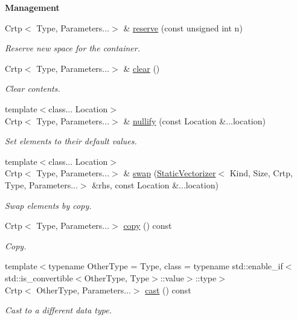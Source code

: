 \begin{Indent}{\bf Management}\par
\begin{DoxyCompactItemize}
\item 
Crtp$<$ Type, Parameters...$>$ \& \hyperlink{classmagrathea_1_1StaticVectorizer_ae15629a58700e638e2a4546742cf09f6}{reserve} (const unsigned int n)
\begin{DoxyCompactList}\small\item\em Reserve new space for the container. \end{DoxyCompactList}\item 
Crtp$<$ Type, Parameters...$>$ \& \hyperlink{classmagrathea_1_1StaticVectorizer_abc4fdc2ce798bc99edc1a874a90bbfe5}{clear} ()
\begin{DoxyCompactList}\small\item\em Clear contents. \end{DoxyCompactList}\item 
{\footnotesize template$<$class... Location$>$ }\\Crtp$<$ Type, Parameters...$>$ \& \hyperlink{classmagrathea_1_1StaticVectorizer_aa2d036d08b09e0f8ec903c7c6442db2b}{nullify} (const Location \&...location)
\begin{DoxyCompactList}\small\item\em Set elements to their default values. \end{DoxyCompactList}\item 
{\footnotesize template$<$class... Location$>$ }\\Crtp$<$ Type, Parameters...$>$ \& \hyperlink{classmagrathea_1_1StaticVectorizer_a8bf8d5dc7fd3290eff136f1262342e8b}{swap} (\hyperlink{classmagrathea_1_1StaticVectorizer}{Static\-Vectorizer}$<$ Kind, Size, Crtp, Type, Parameters...$>$ \&rhs, const Location \&...location)
\begin{DoxyCompactList}\small\item\em Swap elements by copy. \end{DoxyCompactList}\item 
Crtp$<$ Type, Parameters...$>$ \hyperlink{classmagrathea_1_1StaticVectorizer_a15c61ea6878c48725951cce33147cd22}{copy} () const 
\begin{DoxyCompactList}\small\item\em Copy. \end{DoxyCompactList}\item 
{\footnotesize template$<$typename Other\-Type  = Type, class  = typename std\-::enable\-\_\-if$<$std\-::is\-\_\-convertible$<$\-Other\-Type, Type$>$\-::value$>$\-::type$>$ }\\Crtp$<$ Other\-Type, Parameters...$>$ \hyperlink{classmagrathea_1_1StaticVectorizer_ad3d731d6d65b0c6779f8bfa098743817}{cast} () const 
\begin{DoxyCompactList}\small\item\em Cast to a different data type. \end{DoxyCompactList}\end{DoxyCompactItemize}
\end{Indent}
